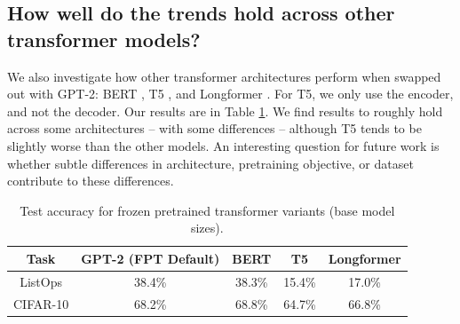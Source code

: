 \subsection{How well do the trends hold across other transformer models?}
\label{sec:alternative_architectures}

We also investigate how other transformer architectures perform when swapped out with GPT-2: BERT \citep{devlin2019bert}, T5 \citep{raffel2019t5}, and Longformer \citep{beltagy2020longformer}.
For T5, we only use the encoder, and not the decoder.
Our results are in Table \ref{table:nlp_architectures}.
We find results to roughly hold across some architectures -- with some differences -- although T5 tends to be slightly worse than the other models.
An interesting question for future work is whether subtle differences in architecture, pretraining objective, or dataset contribute to these differences.

\begin{table}[h] 
\begin{center}
\begin{tabular}{c|cccc}
\toprule
\textbf{Task} & \multicolumn{1}{c}{\bf GPT-2 (FPT Default)} & \multicolumn{1}{c}{\bf BERT} & \multicolumn{1}{c}{\bf T5} & \multicolumn{1}{c}{\bf Longformer} \\
\midrule
ListOps & 38.4\% & 38.3\% & 15.4\% &  17.0\% \\
CIFAR-10 & 68.2\% & 68.8\% & 64.7\% & 66.8\% \\
\bottomrule
\end{tabular}
\end{center}
\caption{Test accuracy for frozen pretrained transformer variants (base model sizes).}\label{table:nlp_architectures}
\end{table}
